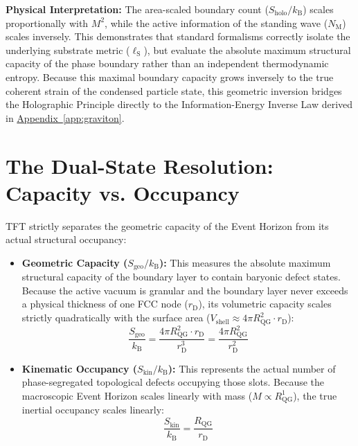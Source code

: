 \noindent\textbf{Physical Interpretation:} The area-scaled boundary count ($S_{\mathrm{holo}}/k_{\mathrm{B}}$) scales proportionally with $M^2$, while the active information of the standing wave ($N_{\mathrm{M}}$) scales inversely. This demonstrates that standard formalisms correctly isolate the underlying substrate metric ($\ell_{\mathrm{S}}$), but evaluate the absolute maximum structural capacity of the phase boundary rather than an independent thermodynamic entropy. Because this maximal boundary capacity grows inversely to the true coherent strain of the condensed particle state, this geometric inversion bridges the Holographic Principle directly to the Information-Energy Inverse Law derived in \hyperref[app:graviton]{Appendix~\ref*{app:graviton}}.

\section{The Dual-State Resolution: Capacity vs. Occupancy}

TFT strictly separates the geometric capacity of the Event Horizon from its actual structural occupancy:

\begin{itemize}
    \item \textbf{Geometric Capacity ($S_{\mathrm{geo}}/k_{\mathrm{B}}$):} This measures the absolute maximum structural capacity of the boundary layer to contain baryonic defect states. Because the active vacuum is granular and the boundary layer never exceeds a physical thickness of one FCC node ($r_{\mathrm{D}}$), its volumetric capacity scales strictly quadratically with the surface area ($V_{\mathrm{shell}} \approx 4\pi R_{\mathrm{QG}}^2 \cdot r_{\mathrm{D}}$):
    \begin{equation}
        \frac{S_{\mathrm{geo}}}{k_{\mathrm{B}}} = \frac{4\pi R_{\mathrm{QG}}^2 \cdot r_{\mathrm{D}}}{r_{\mathrm{D}}^3} = \frac{4\pi R_{\mathrm{QG}}^2}{r_{\mathrm{D}}^2}
    \end{equation}
    \item \textbf{Kinematic Occupancy ($S_{\mathrm{kin}}/k_{\mathrm{B}}$):} This represents the actual number of phase-segregated topological defects occupying those slots. Because the macroscopic Event Horizon scales linearly with mass ($M \propto R_{\mathrm{QG}}^1$), the true inertial occupancy scales linearly:
    \begin{equation}
        \frac{S_{\mathrm{kin}}}{k_{\mathrm{B}}} = \frac{R_{\mathrm{QG}}}{r_{\mathrm{D}}}
    \end{equation}
\end{itemize}

